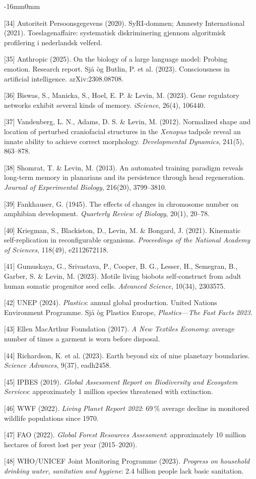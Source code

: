\documentclass[10pt,oneside]{book}
\newcommand{\refentry}[1]{%
  \par\addvspace{0pt}%
  \begingroup\footnotesize\linespread{0.92}\selectfont
  \noindent\hangindent=4mm\hangafter=1 #1\par%
  \endgroup
}
\newenvironment{widebody}{%
  \begin{adjustwidth}{-16mm}{0mm}%
}{%
  \end{adjustwidth}%
}
\begin{document}
\begin{widebody}
\refentry{[34] Autoriteit Persoonsgegevens (2020). SyRI-dommen; Amnesty International (2021). Toeslagenaffaire: systematisk diskriminering gjennom algoritmisk profilering i nederlandsk velferd.}
\refentry{[35] Anthropic (2025). On the biology of a large language model: Probing emotion. Research report. Sjå òg Butlin, P. et al. (2023). Consciousness in artificial intelligence. arXiv:2308.08708.}
\refentry{[36] Biswas, S., Manicka, S., Hoel, E. P. \& Levin, M. (2023). Gene regulatory networks exhibit several kinds of memory. \textit{iScience}, 26(4), 106440.}
\refentry{[37] Vandenberg, L. N., Adams, D. S. \& Levin, M. (2012). Normalized shape and location of perturbed craniofacial structures in the \textit{Xenopus} tadpole reveal an innate ability to achieve correct morphology. \textit{Developmental Dynamics}, 241(5), 863--878.}
\refentry{[38] Shomrat, T. \& Levin, M. (2013). An automated training paradigm reveals long-term memory in planarians and its persistence through head regeneration. \textit{Journal of Experimental Biology}, 216(20), 3799--3810.}
\refentry{[39] Fankhauser, G. (1945). The effects of changes in chromosome number on amphibian development. \textit{Quarterly Review of Biology}, 20(1), 20--78.}
\refentry{[40] Kriegman, S., Blackiston, D., Levin, M. \& Bongard, J. (2021). Kinematic self-replication in reconfigurable organisms. \textit{Proceedings of the National Academy of Sciences}, 118(49), e2112672118.}
\refentry{[41] Gumuskaya, G., Srivastava, P., Cooper, B. G., Lesser, H., Semegran, B., Garber, S. \& Levin, M. (2023). Motile living biobots self-construct from adult human somatic progenitor seed cells. \textit{Advanced Science}, 10(34), 2303575.}
\refentry{[42] UNEP (2024). \textit{Plastics}: annual global production. United Nations Environment Programme. Sjå òg Plastics Europe, \textit{Plastics---The Fast Facts 2023}.}
\refentry{[43] Ellen MacArthur Foundation (2017). \textit{A New Textiles Economy}: average number of times a garment is worn before disposal.}
\refentry{[44] Richardson, K. et al. (2023). Earth beyond six of nine planetary boundaries. \textit{Science Advances}, 9(37), eadh2458.}
\refentry{[45] IPBES (2019). \textit{Global Assessment Report on Biodiversity and Ecosystem Services}: approximately 1 million species threatened with extinction.}
\refentry{[46] WWF (2022). \textit{Living Planet Report 2022}: 69\,\% average decline in monitored wildlife populations since 1970.}
\refentry{[47] FAO (2022). \textit{Global Forest Resources Assessment}: approximately 10 million hectares of forest lost per year (2015--2020).}
\refentry{[48] WHO/UNICEF Joint Monitoring Programme (2023). \textit{Progress on household drinking water, sanitation and hygiene}: 2.4 billion people lack basic sanitation.}

\end{widebody}
\end{document}

